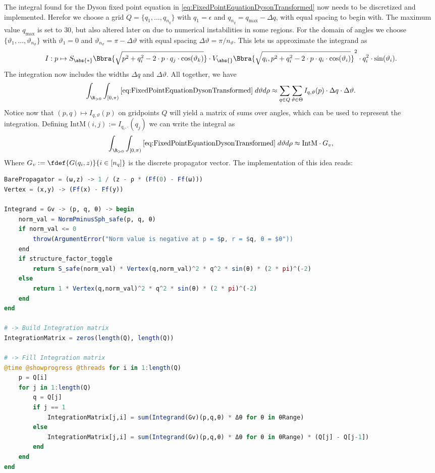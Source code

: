 The integral found for the Dyson fixed point equation in \eqref{eq:FixedPointEquationDysonTransformed} now needs to be discretized and implemented. Herefor we choose a grid $Q = \{q_1,\ldots,q_{n_q}\}$ with $q_1 = \epsilon$ and $q_{n_q} = q_{\text{max}} - \Delta q$, with equal spacing to begin with. The maximum value $q_{\text{max}}$ is set to $30$, but also altered later on due to numerical instabilities in some regions. For the domain of angles we choose $\{\vartheta_1,\ldots,\vartheta_{n_\vartheta}\}$ with $\vartheta_1 = 0$ and $\vartheta_{n_\vartheta} = \pi - \Delta\vartheta$ with equal spacing $\Delta\vartheta = \pi/n_\vartheta$. This lets us approximate the integrand as
\[
    I:p\mapsto S_{\abs{*}}\Bbra{\sqrt{p^2 + q_i^2 - 2\cdot p\cdot q_j\cdot\cos(\vartheta_k)}}\cdot V_{\abs{}}\Bbra{\sqrt{q_i,p^2 + q_i^2 - 2\cdot p\cdot q_i\cdot\cos(\vartheta_i)}}^2\cdot q_i^2\cdot\sin(\vartheta_i).
\] 
The integration now includes the widths $\Delta q$ and $\Delta\vartheta$. All together, we have
\[
    \int_{\R_{>0}}\int_{[0,\pi)}\eqref{eq:FixedPointEquationDysonTransformed}\; d\vartheta d\rho \approx \sum_{q\in Q}\sum_{\vartheta\in\Theta} I_{q,\vartheta}(p)\cdot\Delta q\cdot\Delta\vartheta.
\]
Notice now that $(p,q)\mapsto I_{q,\vartheta}(p)$ on gridpoints $Q$ will yield a matrix of sums over angles, which can be used to represent the integration. Defining $\text{IntM}(i,j):=I_{q_i,\cdot}(q_j)$ we can write the integral as
\[
    \int_{\R_{>0}}\int_{[0,\pi)}\eqref{eq:FixedPointEquationDysonTransformed}\; d\vartheta d\rho \approx\text{IntM}\cdot G_v,
\] 
Where $G_v := \fdef{G(q_i,z)}{i\in[n_q]}$ is the discrete propagator vector. The implementation of this idea reads:
\begin{mdframed}[backgroundcolor=black!4, topline=false, bottomline=false, rightline=false, leftline=false]
    \begin{lstlisting}[language=Julia,basicstyle=\small]
BarePropagator = (ω,z) -> 1 / (z - ρ * (Ff(0) - Ff(ω)))
Vertex = (x,y) -> (Ff(x) - Ff(y))

Integrand = Gv -> (p, q, θ) -> begin
    norm_val = NormPminusSph_safe(p, q, θ)
    if norm_val <= 0
        throw(ArgumentError("Norm value is negative at p = $p, r = $q, θ = $θ"))
    end
    if structure_factor_toggle
    	return S_safe(norm_val) * Vertex(q,norm_val)^2 * q^2 * sin(θ) * (2 * pi)^(-2)
	else 
		return 1 * Vertex(q,norm_val)^2 * q^2 * sin(θ) * (2 * pi)^(-2)
	end
end

# -> Build Integration matrix
IntegrationMatrix = zeros(length(Q), length(Q))

# -> Fill Integration matrix
@time @showprogress @threads for i in 1:length(Q)
	p = Q[i]
	for j in 1:length(Q)
		q = Q[j]
		if j == 1
			IntegrationMatrix[j,i] = sum(Integrand(Gv)(p,q,θ) * Δθ for θ in θRange)
		else 
			IntegrationMatrix[j,i] = sum(Integrand(Gv)(p,q,θ) * Δθ for θ in θRange) * (Q[j] - Q[j-1])
		end
	end
end
    \end{lstlisting}
\end{mdframed}
